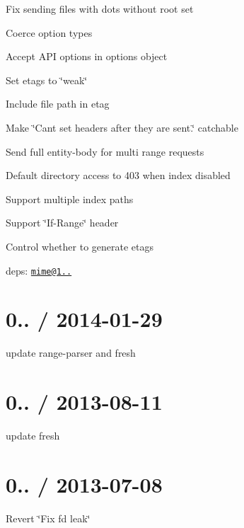 \begin{DoxyItemize}
\item Fix sending files with dots without root set
\item Coerce option types
\item Accept A\+PI options in options object
\item Set etags to \char`\"{}weak\char`\"{}
\item Include file path in etag
\item Make \char`\"{}\+Can\textquotesingle{}t set headers after they are sent.\char`\"{} catchable
\item Send full entity-\/body for multi range requests
\item Default directory access to 403 when index disabled
\item Support multiple index paths
\item Support \char`\"{}\+If-\/\+Range\char`\"{} header
\item Control whether to generate etags
\item deps\+: \href{mailto:mime@1.2.11}{\tt mime@1..}
\end{DoxyItemize}

\section*{0.. / 2014-\/01-\/29 }


\begin{DoxyItemize}
\item update range-\/parser and fresh
\end{DoxyItemize}

\section*{0.. / 2013-\/08-\/11 }


\begin{DoxyItemize}
\item update fresh
\end{DoxyItemize}

\section*{0.. / 2013-\/07-\/08 }


\begin{DoxyItemize}
\item Revert \char`\"{}\+Fix fd leak\char`\"{}
\end{DoxyItemize}

